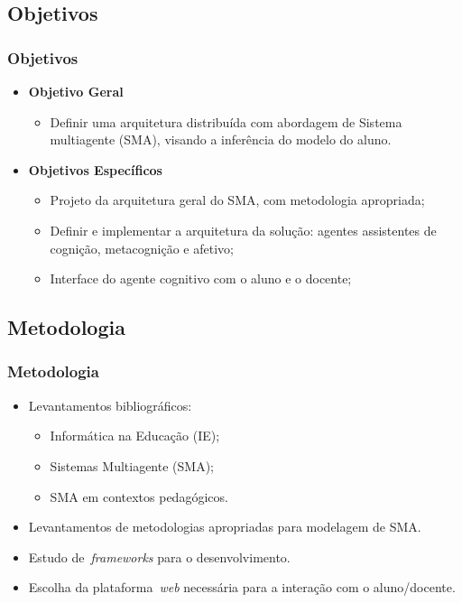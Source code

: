 \documentclass{beamer}
\begin{document}
\subsection{Objetivos}
\begin{frame}
    \frametitle{Objetivos}
    \begin{itemize}
	\item \textbf{Objetivo Geral}
        \begin{itemize}
		\item Definir uma arquitetura distribuída com abordagem de Sistema multiagente (SMA), visando a inferência do modelo do aluno.
	\end{itemize}


	\item \textbf{Objetivos Específicos}
	\begin{itemize}
        	\item Projeto da arquitetura geral do SMA, com metodologia apropriada;
		\item Definir e implementar a arquitetura da solução: agentes assistentes de cognição, metacognição e afetivo;
		\item Interface do agente cognitivo com o aluno e o docente; %
	\end{itemize}
    \end{itemize}
\end{frame}

\subsection{Metodologia}
\begin{frame}
    \frametitle{Metodologia}
    \begin{itemize}
	    \item Levantamentos bibliográficos:
		\begin{itemize}
			\item Informática na Educação (IE);
			\item Sistemas Multiagente (SMA);
			\item SMA em contextos pedagógicos.
		\end{itemize}
	    \item Levantamentos de metodologias apropriadas para modelagem de SMA.
	    \item Estudo de~\emph{frameworks} para o desenvolvimento.
	    \item Escolha da plataforma~\emph{web} necessária para a interação com o aluno/docente.
    \end{itemize}
\end{frame}
\end{document}
